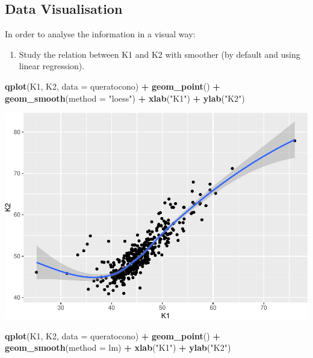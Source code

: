 \documentclass[]{article}
\newenvironment{Shaded}{\begin{snugshade}}{\end{snugshade}}
\newcommand{\DataTypeTok}[1]{\textcolor[rgb]{0.13,0.29,0.53}{#1}}
\newcommand{\KeywordTok}[1]{\textcolor[rgb]{0.13,0.29,0.53}{\textbf{#1}}}
\newcommand{\NormalTok}[1]{#1}
\newcommand{\OperatorTok}[1]{\textcolor[rgb]{0.81,0.36,0.00}{\textbf{#1}}}
\newcommand{\StringTok}[1]{\textcolor[rgb]{0.31,0.60,0.02}{#1}}
\providecommand{\tightlist}{%
  \setlength{\itemsep}{0pt}\setlength{\parskip}{0pt}}
\begin{document}
\hypertarget{data-visualisation}{%
\subsection{Data Visualisation}\label{data-visualisation}}

In order to analyse the information in a visual way:

\begin{enumerate}
\def\labelenumi{\arabic{enumi}.}
\tightlist
\item
  Study the relation between K1 and K2 with smoother (by default and
  using linear regression).
\end{enumerate}

\begin{Shaded}
\begin{Highlighting}[]
\KeywordTok{qplot}\NormalTok{(K1, K2, }\DataTypeTok{data =}\NormalTok{ queratocono) }\OperatorTok{+}
\StringTok{  }\KeywordTok{geom_point}\NormalTok{() }\OperatorTok{+}\StringTok{ }
\StringTok{  }\KeywordTok{geom_smooth}\NormalTok{(}\DataTypeTok{method =} \StringTok{"loess"}\NormalTok{) }\OperatorTok{+}
\StringTok{  }\KeywordTok{xlab}\NormalTok{(}\StringTok{"K1"}\NormalTok{) }\OperatorTok{+}\StringTok{ }\KeywordTok{ylab}\NormalTok{(}\StringTok{"K2"}\NormalTok{)}
\end{Highlighting}
\end{Shaded}

\includegraphics{document_files/figure-latex/unnamed-chunk-3-1.pdf}

\begin{Shaded}
\begin{Highlighting}[]
\KeywordTok{qplot}\NormalTok{(K1, K2, }\DataTypeTok{data =}\NormalTok{ queratocono) }\OperatorTok{+}
\StringTok{  }\KeywordTok{geom_point}\NormalTok{() }\OperatorTok{+}
\StringTok{  }\KeywordTok{geom_smooth}\NormalTok{(}\DataTypeTok{method =}\NormalTok{ lm) }\OperatorTok{+}
\StringTok{  }\KeywordTok{xlab}\NormalTok{(}\StringTok{"K1"}\NormalTok{) }\OperatorTok{+}\StringTok{ }\KeywordTok{ylab}\NormalTok{(}\StringTok{"K2"}\NormalTok{)}
\end{Highlighting}
\end{Shaded}
\end{document}
